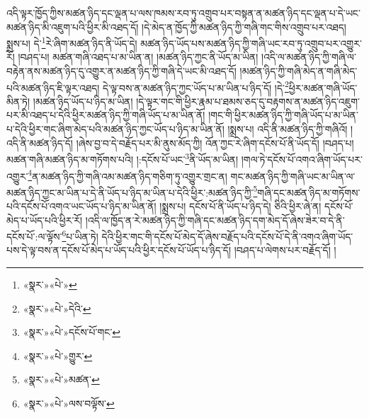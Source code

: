 འདི་ལྟར་ཁྱོད་ཀྱིས་མཚན་ཉིད་དང་ལྡན་པ་ལས་ཁམས་རབ་ཏུ་འགྲུབ་པར་བསྟན་ན་མཚན་ཉིད་དང་ལྡན་པ་དེ་ཡང་མཚན་ཉིད་མི་འཇུག་པའི་ཕྱིར་མི་འཐད་དོ། །དེ་མེད་ན་ཁྱོད་ཀྱི་མཚན་ཉིད་ཀྱི་གཞི་གང་གིས་འགྲུབ་པར་འཐད། སྨྲས་པ། དེ་\footnote{«སྣར་»«པེ་»}རེ་ཞིག་མཚན་ཉིད་ནི་ཡོད་དེ། མཚན་ཉིད་ཡོད་པས་མཚན་ཉིད་ཀྱི་གཞི་ཡང་རབ་ཏུ་འགྲུབ་པར་འགྱུར་རོ། །བཤད་པ། མཚན་གཞི་འཐད་པ་མ་ཡིན་ན། །མཚན་ཉིད་ཀྱང་ནི་ཡོད་མ་ཡིན། །འདི་ལ་མཚན་ཉིད་ཀྱི་གཞི་ལ་བརྟེན་ནས་མཚན་ཉིད་དུ་འགྱུར་ན་མཚན་ཉིད་ཀྱི་གཞི་དེ་ཡང་མི་འཐད་དོ། །མཚན་ཉིད་ཀྱི་གཞི་མེད་ན་གཞི་མེད་པའི་མཚན་ཉིད་ཇི་ལྟར་འཐད། དེ་ལྟ་བས་ན་མཚན་ཉིད་ཀྱང་ཡོད་པ་མ་ཡིན་པ་ཉིད་དོ། །དེ་\footnote{«སྣར་»«པེ་»དེའི་}ཕྱིར་མཚན་གཞི་ཡོད་མིན་ཏེ། །མཚན་ཉིད་ཡོད་པ་ཉིད་མ་ཡིན། །དེ་ལྟར་གང་གི་ཕྱིར་རྣམ་པ་ཐམས་ཅད་དུ་བརྟགས་ན་མཚན་ཉིད་འཇུག་པར་མི་འཐད་པ་དེའི་ཕྱིར་མཚན་ཉིད་ཀྱི་གཞི་ཡོད་པ་མ་ཡིན་ནོ། །གང་གི་ཕྱིར་མཚན་ཉིད་ཀྱི་གཞི་ཡོད་པ་མ་ཡིན་པ་དེའི་ཕྱིར་གང་ཞིག་མེད་པའི་མཚན་ཉིད་ཀྱང་ཡོད་པ་ཉིད་མ་ཡིན་ནོ། །སྨྲས་པ། འདི་ནི་མཚན་ཉིད་ཀྱི་གཞིའོ། །འདི་ནི་མཚན་ཉིད་དོ། །ཞེས་བྱ་བ་དེ་བརྗོད་པར་མི་ནུས་མོད་ཀྱི། འོན་ཀྱང་རེ་ཞིག་དངོས་པོ་ནི་ཡོད་དོ། །བཤད་པ། མཚན་གཞི་མཚན་ཉིད་མ་གཏོགས་པའི། །:དངོས་པོ་ཡང་\footnote{«སྣར་»«པེ་»དངོས་པོ་གང་}ནི་ཡོད་མ་ཡིན། །གལ་ཏེ་དངོས་པོ་འགའ་ཞིག་ཡོད་པར་འགྱུར་\footnote{«སྣར་»«པེ་»གྱུར་}ན་མཚན་ཉིད་ཀྱི་གཞི་འམ་མཚན་ཉིད་གཅིག་ཏུ་འགྱུར་གྲང་ན། གང་མཚན་ཉིད་ཀྱི་གཞི་ཡང་མ་ཡིན་ལ་མཚན་ཉིད་ཀྱང་མ་ཡིན་པ་དེ་ནི་ཡོད་པ་ཉིད་མ་ཡིན་པ་དེའི་ཕྱིར་:མཚན་ཉིད་ཀྱི་\footnote{«སྣར་»«པེ་»མཚན་}གཞི་དང་མཚན་ཉིད་མ་གཏོགས་པའི་དངོས་པོ་འགའ་ཡང་ཡོད་པ་ཉིད་མ་ཡིན་ནོ། །སྨྲས་པ། དངོས་པོ་ནི་ཡོད་པ་ཉིད་དེ། ཅིའི་ཕྱིར་ཞེ་ན། དངོས་པོ་མེད་པ་ཡོད་པའི་ཕྱིར་རོ། །འདི་ལ་ཁྱོད་ན་རེ་མཚན་ཉིད་ཀྱི་གཞི་དང་མཚན་ཉིད་དག་མེད་དོ་ཞེས་ཟེར་བ་དེ་ནི་དངོས་པོ་:ལ་ལྟོས་\footnote{«སྣར་»«པེ་»ལས་བལྟོས་}པ་ཡིན་ཏེ། དེའི་ཕྱིར་གང་གི་དངོས་པོ་མེད་དོ་ཞེས་བརྗོད་པའི་དངོས་པོ་དེ་ནི་འགའ་ཞིག་ཡོད་པས་དེ་ལྟ་བས་ན་དངོས་པོ་མེད་པ་ཡོད་པའི་ཕྱིར་དངོས་པོ་ཡོད་པ་ཉིད་དོ། །བཤད་པ་ལེགས་པར་བརྗོད་དོ། །
